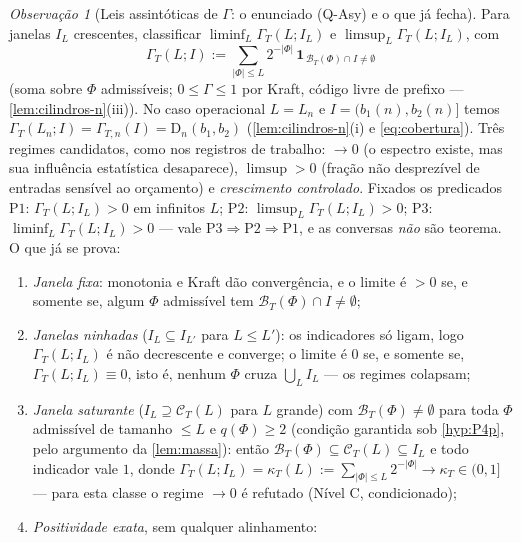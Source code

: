 \documentclass[11pt,a4paper]{article}
\theoremstyle{definition}
\theoremstyle{remark}
\newtheorem*{remark}{Observação}
\begin{document}
\begin{remark}[Leis assintóticas de $\Gamma$: o enunciado (Q-Asy) e o que já fecha]\label{rem:assintoticos}
Para janelas $I_L$ crescentes, classificar $\liminf_L \Gamma_T(L;I_L)$
e $\limsup_L \Gamma_T(L;I_L)$, com
\begin{equation}\label{eq:gamma}
  \Gamma_T(L;I) := \sum_{|\Phi| \leq L} 2^{-|\Phi|}\,
  \mathbf{1}_{\,\mathcal{B}_T(\Phi) \cap I \neq \emptyset}
\end{equation}
(soma sobre $\Phi$ admissíveis; $0 \leq \Gamma \leq 1$
por Kraft, código livre de prefixo --- \cref{lem:cilindros-n}(iii)).
No caso operacional $L = L_n$ e $I = (b_1(n), b_2(n)]$ temos
$\Gamma_T(L_n; I) = \Gamma_{T,n}(I) = \mathrm{D}_n(b_1,b_2)$
(\cref{lem:cilindros-n}(i) e \eqref{eq:cobertura}). Três regimes
candidatos, como nos registros de trabalho: $\to 0$ (o espectro
existe, mas sua influência estatística desaparece), $\limsup > 0$
(fração não desprezível de entradas sensível ao orçamento) e
\emph{crescimento controlado}. Fixados os predicados
$\mathrm{P1}$: $\Gamma_T(L;I_L) > 0$ em infinitos $L$; $\mathrm{P2}$:
$\limsup_L \Gamma_T(L;I_L) > 0$; $\mathrm{P3}$: $\liminf_L
\Gamma_T(L;I_L) > 0$ --- vale $\mathrm{P3} \Rightarrow \mathrm{P2}
\Rightarrow \mathrm{P1}$, e as conversas \emph{não} são teorema. O que
já se prova:
\begin{enumerate}
\item[(a)] \emph{Janela fixa}: monotonia e Kraft dão convergência, e o
  limite é $> 0$ se, e somente se, algum $\Phi$ admissível tem
  $\mathcal{B}_T(\Phi) \cap I \neq \emptyset$;
\item[(b)] \emph{Janelas ninhadas} ($I_L \subseteq I_{L'}$ para $L
  \leq L'$): os indicadores só ligam, logo $\Gamma_T(L;I_L)$ é não
  decrescente e converge; o limite é $0$ se, e somente se,
  $\Gamma_T(L;I_L) \equiv 0$, isto é, nenhum $\Phi$ cruza
  $\bigcup_L I_L$ --- os regimes colapsam;
\item[(c)] \emph{Janela saturante} ($I_L \supseteq \mathcal{C}_T(L)$
  para $L$ grande) com $\mathcal{B}_T(\Phi) \neq \emptyset$ para toda
  $\Phi$ admissível de tamanho $\leq L$ e $q(\Phi) \geq 2$ (condição
  garantida sob \cref{hyp:P4p}, pelo argumento da \cref{lem:massa}):
  então $\mathcal{B}_T(\Phi) \subseteq \mathcal{C}_T(L) \subseteq I_L$
  e todo indicador vale $1$, donde
  $\Gamma_T(L;I_L) = \kappa_T(L) := \sum_{|\Phi| \leq L}
  2^{-|\Phi|} \to \kappa_T \in (0,1]$ --- para esta classe o regime
  $\to 0$ é refutado (Nível C, condicionado);
\item[(d)] \emph{Positividade exata}, sem qualquer alinhamento:

\end{enumerate}
\end{remark}
\end{document}

